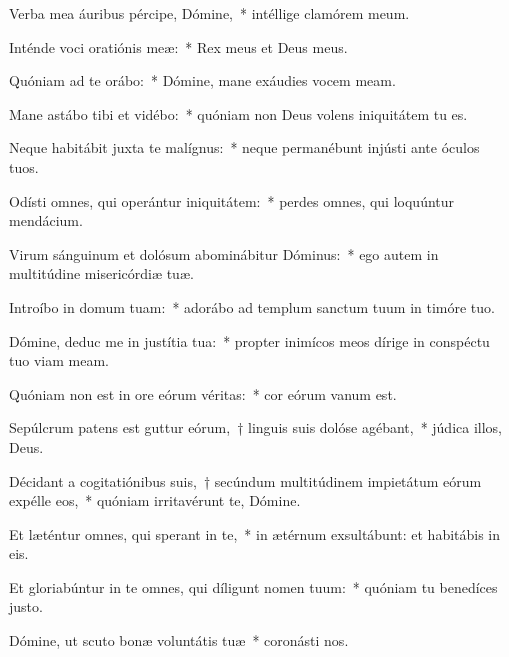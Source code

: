\item Verba mea áuribus pércipe, Dómine,~* intéllige clamórem meum.

\item Inténde voci oratiónis meæ:~* Rex meus et Deus meus.

\item Quóniam ad te orábo:~* Dómine, mane exáudies vocem meam.

\item Mane astábo tibi et vidébo:~* quóniam non Deus volens iniquitátem tu es.

\item Neque habitábit juxta te malígnus:~* neque permanébunt injústi ante óculos tuos.

\item Odísti omnes, qui operántur iniquitátem:~* perdes omnes, qui loquúntur mendácium.

\item Virum sánguinum et dolósum abominábitur Dóminus:~* ego autem in multitúdine misericórdiæ tuæ.

\item Introíbo in domum tuam:~* adorábo ad templum sanctum tuum in timóre tuo.

\item Dómine, deduc me in justítia tua:~* propter inimícos meos dírige in conspéctu tuo viam meam.

\item Quóniam non est in ore eórum véritas:~* cor eórum vanum est.

\item Sepúlcrum patens est guttur eórum,~† linguis suis dolóse agébant,~* júdica illos, Deus.

\item Décidant a cogitatiónibus suis,~† secúndum multitúdinem impietátum eórum expélle eos,~* quóniam irritavérunt te, Dómine.

\item Et læténtur omnes, qui sperant in te,~* in ætérnum exsultábunt: et habitábis in eis.

\item Et gloriabúntur in te omnes, qui díligunt nomen tuum:~* quóniam tu benedíces justo.

\item Dómine, ut scuto bonæ voluntátis tuæ~* coronásti nos.

